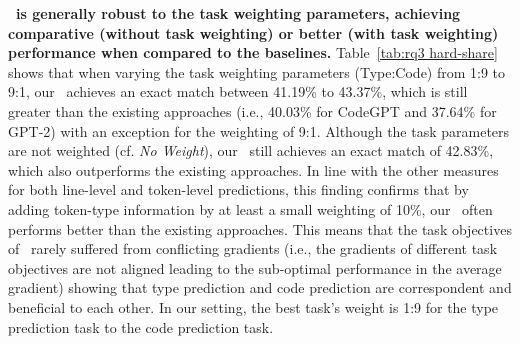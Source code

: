 \textbf{\our~is generally robust to the task weighting parameters, achieving comparative (without task weighting) or better (with task weighting) performance when compared to the baselines.}
Table~\ref{tab:rq3 hard-share} shows that when varying the task weighting parameters (Type:Code) from 1:9 to 9:1, our \our~achieves an exact match between 41.19\% to 43.37\%, which is still greater than the existing approaches (i.e., 40.03\% for CodeGPT and 37.64\% for GPT-2) with an exception for the weighting of 9:1.
Although the task parameters are not weighted (cf. \emph{No Weight}), our \our~still achieves an exact match of 42.83\%, which also outperforms the existing approaches.
In line with the other measures for both line-level and token-level predictions, this finding confirms that by adding token-type information by at least a small weighting of 10\%, our \our~often performs better than the existing approaches.
This means that the task objectives of \our~rarely suffered from conflicting gradients (i.e., the gradients of different task objectives are not aligned leading to the sub-optimal performance in the average gradient) showing that type prediction and code prediction are correspondent and beneficial to each other.
In our setting, the best task's weight is 1:9 for the type prediction task to the code prediction task.


